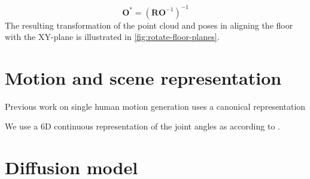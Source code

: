 \begin{equation}
    \mathbf{O}^* = \left(\mathbf{R} \mathbf{O}^{-1} \right)^{-1}
\end{equation}
The resulting transformation of the point cloud and poses in aligning the floor with the XY-plane is illustrated in \cref{fig:rotate-floor-planes}.

\section{Motion and scene representation}
Previous work on single human motion generation uses a canonical representation 

We use a 6D continuous representation of the joint angles as according to \cite{Zhou_2019_CVPR}.


\section{Diffusion model}



